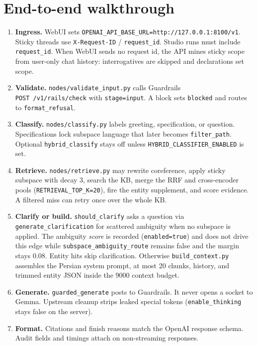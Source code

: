 \section{End-to-end walkthrough}\label{end-to-end-walkthrough}

\begin{enumerate}
\def\labelenumi{\arabic{enumi}.}
\item
  \textbf{Ingress.} WebUI sets \texttt{OPENAI\_API\_BASE\_URL=http://127.0.0.1:8100/v1}. Sticky threads use \texttt{X-Request-ID} / \texttt{request\_id}. Studio runs must include \texttt{request\_id}. When WebUI sends no request id, the API mines sticky scope from user-only chat history: interrogatives are skipped and declarations set scope.
\item
  \textbf{Validate.} \texttt{nodes/validate\_input.py} calls Guardrails \texttt{POST\ /v1/rails/check} with \texttt{stage=input}. A block sets \texttt{blocked} and routes to \texttt{format\_refusal}.
\item
  \textbf{Classify.} \texttt{nodes/classify.py} labels greeting, specification, or question. Specifications lock subspace language that later becomes \texttt{filter\_path}. Optional \texttt{hybrid\_classify} stays off unless \texttt{HYBRID\_CLASSIFIER\_ENABLED} is set.
\item
  \textbf{Retrieve.} \texttt{nodes/retrieve.py} may rewrite coreference, apply sticky subspace with decay 3, search the KB, merge the RRF and cross-encoder pools (\texttt{RETRIEVAL\_TOP\_K=20}), fire the entity supplement, and score evidence. A filtered miss can retry once over the whole KB.
\item
  \textbf{Clarify or build.} \texttt{should\_clarify} asks a question via \texttt{generate\_clarification} for scattered ambiguity when no subspace is applied. The ambiguity \emph{score} is recorded (\texttt{enabled=true}) and does not drive this edge while \texttt{subspace\_ambiguity\_route} remains false and the margin stays 0.08. Entity hits skip clarification. Otherwise \texttt{build\_context.py} assembles the Persian system prompt, at most 20 chunks, history, and trimmed entity JSON inside the 9000 context budget.
\item
  \textbf{Generate.} \texttt{guarded\_generate} posts to Guardrails. It never opens a socket to Gemma. Upstream cleanup strips leaked special tokens (\texttt{enable\_thinking} stays false on the server).
\item
  \textbf{Format.} Citations and finish reasons match the OpenAI response schema. Audit fields and timings attach on non-streaming responses.
\end{enumerate}

